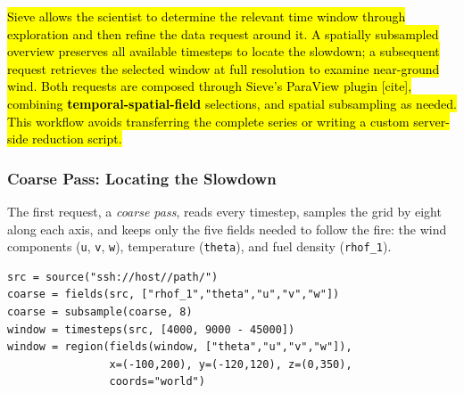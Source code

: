\documentclass{vgtc}
\newcommand{\sname}{Sieve}
\newcommand{\code}[1]{\texttt{#1}}
\newcommand{\todo}[1]{\textcolor{red}{\textbf{[TODO: #1]}}}
\begin{document}

\hl{\sname{} allows the scientist to determine the relevant time window through exploration and then refine the data request around it. A spatially subsampled overview preserves all available timesteps to locate the slowdown; a subsequent request retrieves the selected window at full resolution to examine near-ground wind. Both requests are composed through \sname{}'s ParaView plugin [cite], combining \textbf{temporal-spatial-field} selections, and spatial subsampling as needed. This workflow avoids transferring the complete series or writing a custom server-side reduction script.}

\subsubsection{Coarse Pass: Locating the Slowdown}

The first request, a \emph{coarse pass}, reads every timestep, samples the grid by eight along each axis, and keeps only the five fields needed to follow the fire: the wind components (\code{u}, \code{v}, \code{w}), temperature (\code{theta}), and fuel density (\code{rhof\_1}).


\begin{lstlisting}[language=Sieve,numbers=none,basicstyle=\ttfamily\footnotesize, frame=tb, caption={\todo{Missing caption}}]
src = source("ssh://host//path/")
coarse = fields(src, ["rhof_1","theta","u","v","w"])
coarse = subsample(coarse, 8)
window = timesteps(src, [4000, 9000 - 45000])
window = region(fields(window, ["theta","u","v","w"]),
                x=(-100,200), y=(-120,120), z=(0,350),
                coords="world")
\end{lstlisting}
\end{document}
